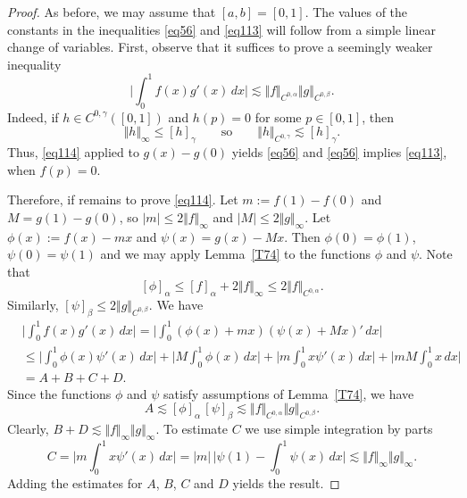 \documentclass[intlimits,12pt,reqno]{amsart}
\numberwithin{equation}{section}
\theoremstyle{definition}
\begin{document}
\begin{proof}
As before, we may assume that $[a,b]=[0,1]$. The values of the constants in the inequalities \eqref{eq56} and \eqref{eq113} will follow from a simple linear change of variables.
First, observe that it suffices to prove a seemingly weaker inequality
\begin{equation}
\label{eq114}
\Bigg|\int_0^1 f(x)g'(x)\, dx\Bigg|\lesssim \Vert f\Vert_{C^{0,\alpha}}\Vert g\Vert_{C^{0,\beta}}.
\end{equation}
Indeed, if $h\in C^{0,\gamma}([0,1])$ and $h(p)=0$ for some $p\in [0,1]$, then
$$
\Vert h\Vert_\infty\leq [h]_{\gamma}
\qquad
\text{so}
\qquad
\Vert h\Vert_{C^{0,\gamma}}\lesssim [h]_{\gamma}.
$$
Thus, \eqref{eq114} applied to $g(x)-g(0)$ yields \eqref{eq56} and \eqref{eq56} implies \eqref{eq113}, when $f(p)=0$. 

Therefore, if remains to prove \eqref{eq114}.
Let $m:=f(1)-f(0)$ and $M=g(1)-g(0)$, so $|m|\leq 2\Vert f\Vert_\infty$ and $|M|\leq 2\Vert g\Vert_\infty$. Let $\phi(x):=f(x)-mx$ and $\psi(x)=g(x)-Mx$. Then $\phi(0)=\phi(1)$, $\psi(0)=\psi(1)$ and we may apply Lemma~\ref{T74} to the functions $\phi$ and $\psi$. Note that
$$
[\phi]_{\alpha}\leq [f]_{\alpha}+2\Vert f\Vert_\infty\leq 2\Vert f\Vert_{C^{0,\alpha}}.
$$
Similarly, $[\psi]_{\beta}\leq 2\Vert g\Vert_{C^{0,\beta}}$. We have
\[
\begin{split}
&
\Bigg|\int_0^1 f(x)g'(x)\, dx\Bigg|=
\Bigg|\int_0^1(\phi(x)+mx)(\psi(x)+Mx)'\, dx\Bigg|\\
&\leq
\Bigg|\int_0^1\phi(x)\psi'(x)\, dx\Bigg|+
\Bigg|M\int_0^1\phi(x)\, dx\Bigg|+
\Bigg|m\int_0^1x\psi'(x)\, dx\Bigg|+
\Bigg|mM\int_0^1 x\, dx\Bigg|\\
&=
A+B+C+D.
\end{split}
\]
Since the functions $\phi$ and $\psi$ satisfy assumptions of Lemma~\ref{T74}, we have
$$
A\lesssim [\phi]_{\alpha}\,[\psi]_{\beta}\lesssim
\Vert f\Vert_{C^{0,\alpha}}\Vert g\Vert_{C^{0,\beta}}.
$$
Clearly, $B+D\lesssim\Vert f\Vert_\infty\Vert g\Vert_\infty$. To estimate $C$ we use simple integration by parts
$$
C=\Bigg|m\int_0^1 x\psi'(x)\, dx\Bigg|=
|m|\, \Bigg|\psi(1)-\int_0^1\psi(x)\, dx\Bigg|\lesssim\Vert f\Vert_\infty\Vert g\Vert_\infty.
$$
Adding the estimates for $A$, $B$, $C$ and $D$ yields the result.
\end{proof}
\end{document}
